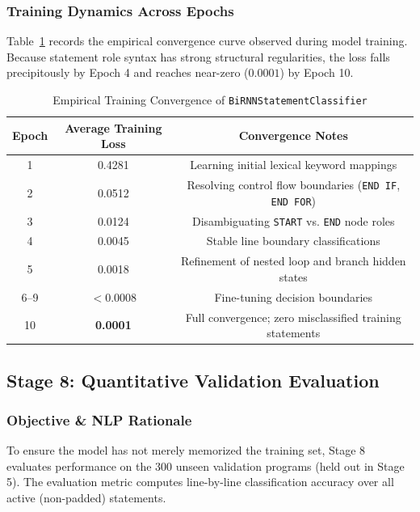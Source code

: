 \documentclass[11pt,a4paper]{article}
\begin{document}
\subsubsection{Training Dynamics Across Epochs}
Table~\ref{tab:training} records the empirical convergence curve observed during model training. Because statement role syntax has strong structural regularities, the loss falls precipitously by Epoch 4 and reaches near-zero ($0.0001$) by Epoch 10.

\begin{table}[htbp]
\centering
\caption{Empirical Training Convergence of \texttt{BiRNNStatementClassifier}}
\label{tab:training}
\begin{tabular}{@{}ccc@{}}
\toprule
\textbf{Epoch} & \textbf{Average Training Loss} & \textbf{Convergence Notes} \\ \midrule
1 & 0.4281 & Learning initial lexical keyword mappings \\
2 & 0.0512 & Resolving control flow boundaries (\texttt{END IF}, \texttt{END FOR}) \\
3 & 0.0124 & Disambiguating \texttt{START} vs. \texttt{END} node roles \\
4 & 0.0045 & Stable line boundary classifications \\
5 & 0.0018 & Refinement of nested loop and branch hidden states \\
6--9 & $< 0.0008$ & Fine-tuning decision boundaries \\
10 & \textbf{0.0001} & Full convergence; zero misclassified training statements \\ \bottomrule
\end{tabular}
\end{table}

\subsection{Stage 8: Quantitative Validation Evaluation}

\subsubsection{Objective \& NLP Rationale}
To ensure the model has not merely memorized the training set, Stage 8 evaluates performance on the 300 unseen validation programs (held out in Stage 5). The evaluation metric computes line-by-line classification accuracy over all active (non-padded) statements.
\end{document}
